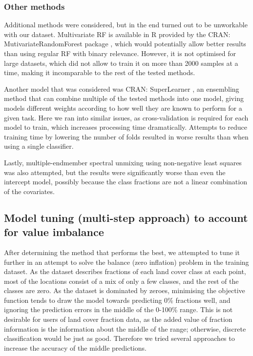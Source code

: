 \documentclass[review,authoryear,3p]{elsarticle}
\newcommand{\cran}[1]{CRAN: #1}
\begin{document}
\subsubsection{Other methods}

Additional methods were considered, but in the end turned out to be unworkable with our dataset.
Multivariate \gls{RF} is available in R provided by the \cran{MutivariateRandomForest} package \citep{MultivariateRandomForest}, which would potentially allow better results than using regular \gls{RF} with binary relevance.
However, it is not optimised for large datasets, which did not allow to train it on more than 2000 samples at a time, making it incomparable to the rest of the tested methods.

Another model that was considered was \cran{SuperLearner} \citep{SuperLearner}, an ensembling method that can combine multiple of the tested methods into one model, giving models different weights according to how well they are known to perform for a given task.
Here we ran into similar issues, as cross-validation is required for each model to train, which increases processing time dramatically.
Attempts to reduce training time by lowering the number of folds resulted in worse results than when using a single classifier.

Lastly, multiple-endmember spectral unmixing using non-negative least squares \citep{franc2005sequential} was also attempted, but the results were significantly worse than even the intercept model, possibly because the class fractions are not a linear combination of the covariates.

\subsection{Model tuning (multi-step approach) to account for value imbalance}
\label{sec-multistep}

After determining the method that performs the best, we attempted to tune it further in an attempt to solve the balance (zero inflation) problem in the training dataset.
As the dataset describes fractions of each land cover class at each point, most of the locations consist of a mix of only a few classes, and the rest of the classes are zero.
As the dataset is dominated by zeroes, minimising the objective function tends to draw the model towards predicting 0\% fractions well, and ignoring the prediction errors in the middle of the 0-100\% range.
This is not desirable for users of land cover fraction data, as the added value of fraction information is the information about the middle of the range; otherwise, discrete classification would be just as good.
Therefore we tried several approaches to increase the accuracy of the middle predictions.
\end{document}
